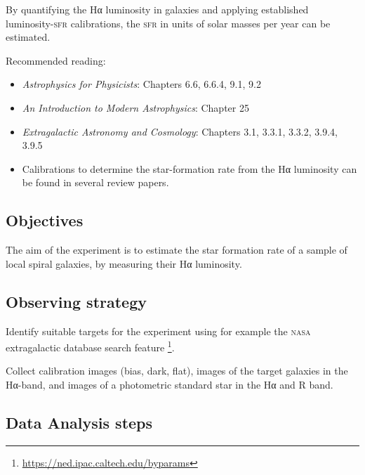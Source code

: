 \documentclass[a4paper, 11pt, fleqn]{memoir}
\begin{document}
By quantifying the Hα luminosity in galaxies and applying established luminosity-\textsc{sfr} calibrations, the \textsc{sfr} in units of solar masses per year can be estimated.

Recommended reading: 
\begin{itemize}
    \item \emph{Astrophysics for Physicists}\autocite{Choudhuri}: Chapters 6.6, 6.6.4, 9.1, 9.2
    \item \emph{An Introduction to Modern Astrophysics}\autocite{carroll2017introduction}: Chapter 25
    \item \emph{Extragalactic Astronomy and Cosmology}\autocite{Schneider2006ExtragalacticAstronomy}: Chapters 3.1, 3.3.1, 3.3.2, 3.9.4, 3.9.5
    \item Calibrations to determine the star-formation rate from the Hα luminosity can be found in several review papers.\autocite{StarFormationCalzetti2013,StarFormationGonzalez2002} %
\end{itemize}

\subsection{Objectives}

The aim of the experiment is to estimate the star formation rate of a sample of local spiral galaxies, by measuring their Hα luminosity.


\subsection{Observing strategy}
Identify suitable targets for the experiment using for example the \textsc{nasa} extragalactic database search feature \footnote{\url{https://ned.ipac.caltech.edu/byparams}}.

Collect calibration images (bias, dark, flat), images of the target galaxies in the Hα-band, and images of a photometric standard star in the Hα and R band.

\subsection{Data Analysis steps}

\end{document}

